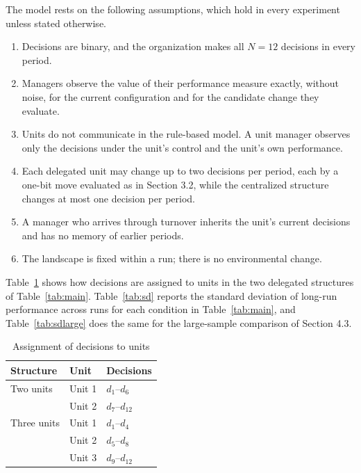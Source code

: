 \documentclass[11pt]{article}
\begin{document}
The model rests on the following assumptions, which hold in every experiment unless stated otherwise.

\begin{enumerate}
\item[A.1] Decisions are binary, and the organization makes all $N = 12$ decisions in every period.
\item[A.2] Managers observe the value of their performance measure exactly, without noise, for the current configuration and for the candidate change they evaluate.
\item[A.3] Units do not communicate in the rule-based model. A unit manager observes only the decisions under the unit's control and the unit's own performance.
\item[A.4] Each delegated unit may change up to two decisions per period, each by a one-bit move evaluated as in Section 3.2, while the centralized structure changes at most one decision per period.
\item[A.5] A manager who arrives through turnover inherits the unit's current decisions and has no memory of earlier periods.
\item[A.6] The landscape is fixed within a run; there is no environmental change.
\end{enumerate}

Table~\ref{tab:units} shows how decisions are assigned to units in the two delegated structures of Table~\ref{tab:main}. Table~\ref{tab:sd} reports the standard deviation of long-run performance across runs for each condition in Table~\ref{tab:main}, and Table~\ref{tab:sdlarge} does the same for the large-sample comparison of Section 4.3.

\begin{table}[h]
\centering
\caption{Assignment of decisions to units}
\label{tab:units}
\begin{tabular}{lll}
\toprule
Structure & Unit & Decisions \\
\midrule
Two units & Unit 1 & $d_1$--$d_6$ \\
 & Unit 2 & $d_7$--$d_{12}$ \\
Three units & Unit 1 & $d_1$--$d_4$ \\
 & Unit 2 & $d_5$--$d_8$ \\
 & Unit 3 & $d_9$--$d_{12}$ \\
\bottomrule
\end{tabular}
\end{table}
\end{document}
